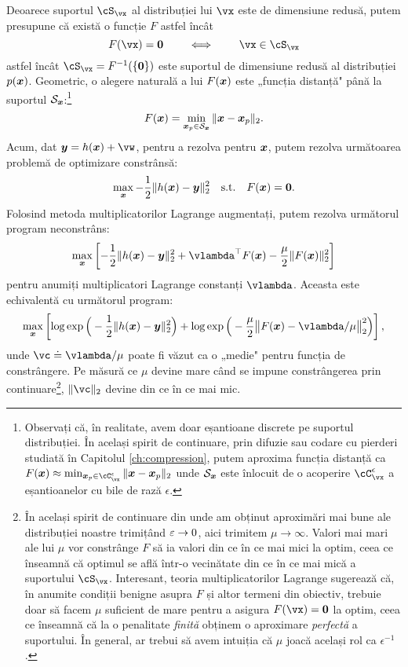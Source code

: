\documentclass[../../book-main_ro.tex]{subfiles}
\begin{document}
Deoarece suportul \(\cS_{\vx}\) al distribuției lui \(\vx\) este de dimensiune redusă, putem presupune că există o funcție \(F\) astfel încât
\begin{equation}
  F(\vx) = \boldsymbol{0} \qquad \iff \qquad \vx \in \cS_{\vx}
\end{equation}
astfel încât \(\cS_{\vx} = F^{-1}(\{\vzero\})\) este suportul de dimensiune redusă al distribuției $p(\bm{x})$. Geometric, o alegere naturală a lui $F(\bm{x})$ este „funcția distanță" până la suportul $\mathcal{S}_{\bm{x}}$:\footnote{Observați că, în realitate, avem doar eșantioane discrete pe suportul distribuției. În același spirit de continuare, prin difuzie sau codare cu pierderi studiată în Capitolul \ref{ch:compression}, putem aproxima funcția distanță ca $F(\x) \approx \min_{\x_p \in \cC_{\vx}^{\epsilon}} \|\x - \x_p\|_2$ unde $\mathcal{S}_{\bm{x}}$ este înlocuit de o acoperire \(\cC_{\vx}^{\epsilon}\) a eșantioanelor cu bile de rază $\epsilon$.}
\begin{equation}
    F(\bm{x}) = \min_{\bm{x}_p \in \mathcal{S}_{\bm{x}}} \|\bm{x} - \bm{x}_p\|_2. 
\end{equation}
Acum, dat $\y = h(\x) +\vw$, pentru a rezolva pentru $\bm{x}$, putem rezolva următoarea problemă de optimizare constrânsă:
\begin{equation}
    \max_{\bm{x}} - \frac{1}{2}\|h(\bm{x}) - \bm{y}\|_2^2 \quad \mbox{s.t.} \quad F(\bm{x}) = \boldsymbol{0}. 
\end{equation}
Folosind metoda multiplicatorilor Lagrange augmentați, putem rezolva următorul program neconstrâns:
\begin{equation}
   \max_{\x} \left[-\frac{1}{2}\|h(\x) - \y\|_2^2  + \vlambda^{\top} F(\x) - \frac{\mu}{2} \|F(\x)\|_2^2\right]
\end{equation}
pentru anumiți multiplicatori Lagrange constanți $\vlambda$.
Aceasta este echivalentă cu următorul program:
\begin{equation}\label{eq:lagrange_multiplier_continuation}
\max_{\x} \left[\log \exp\Big(- \frac{1}{2}\|h(\x) - \y\|_2^2\Big) + \log \exp\Big( - \frac{\mu}{2} \big\|F(\x) - \vlambda/\mu\big\|_2^2\Big)\right],
\end{equation} 
unde $\vc \doteq {\vlambda}/{\mu}$ poate fi văzut ca o „medie" pentru funcția de constrângere. Pe măsură ce $\mu$ devine mare când se impune constrângerea prin continuare\footnote{În același spirit de continuare din  unde am obținut aproximări mai bune ale distribuției noastre trimițând \(\varepsilon \to 0\), aici trimitem \(\mu \to \infty\). Valori mai mari ale lui \(\mu\) vor constrânge \(F\) să ia valori din ce în ce mai mici la optim, ceea ce înseamnă că optimul se află într-o vecinătate din ce în ce mai mică a suportului \(\cS_{\vx}\). Interesant, teoria multiplicatorilor Lagrange sugerează că, în anumite condiții benigne asupra \(F\) și altor termeni din obiectiv, trebuie doar să facem \(\mu\) suficient de mare pentru a asigura \(F(\vx) = \vzero\) la optim, ceea ce înseamnă că la o penalitate \textit{finită} obținem o aproximare \textit{perfectă} a suportului. În general, ar trebui să avem intuiția că \(\mu\) joacă același rol ca \(\epsilon^{-1}\).}, $\|\vc\|_2$ devine din ce în ce mai mic.
\end{document}
